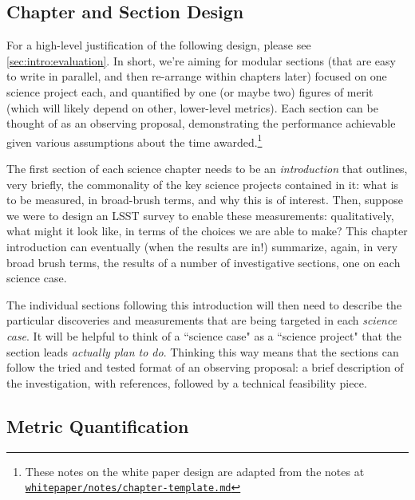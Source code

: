 \subsection{Chapter and Section Design}

For a high-level justification of the following design, please see
\autoref{sec:intro:evaluation}. In short, we're aiming for modular
sections (that are easy to write in parallel, and then re-arrange
within chapters later) focused on one science project each, and
quantified by one (or maybe two) figures of merit (which will likely
depend on other, lower-level metrics). Each section can be thought of
as an observing proposal, demonstrating the performance achievable
given various assumptions about the time awarded.\footnote{These notes
on the white paper design are adapted from the notes at
\href{https://github.com/LSSTScienceCollaborations/ObservingStrategy/blob/master/whitepaper/notes/chapter-template.md}{\texttt{whitepaper/notes/chapter-template.md}}}


The first section of each science chapter needs to be an {\it introduction}
that outlines, very briefly, the commonality of the key science projects
contained in it:  what is to be measured, in broad-brush terms, and
why this is of interest. Then, suppose we were to design an LSST
survey to enable these measurements: qualitatively, what might it look
like, in terms of the choices we are able to make? This chapter
introduction can eventually (when the results are in!) summarize,
again, in very broad brush terms, the results of a number of
investigative sections, one on each science case.

The individual sections following this introduction will then need to
describe the particular discoveries and measurements that are being
targeted in each {\it science case}. It will be helpful to think of a
``science case" as a ``science project" that the section leads {\it
actually plan to do}. Thinking this way means that the sections can
follow the tried and tested format of an observing proposal: a brief
description of the investigation, with references, followed by a
technical feasibility piece.


\subsection{Metric Quantification}


